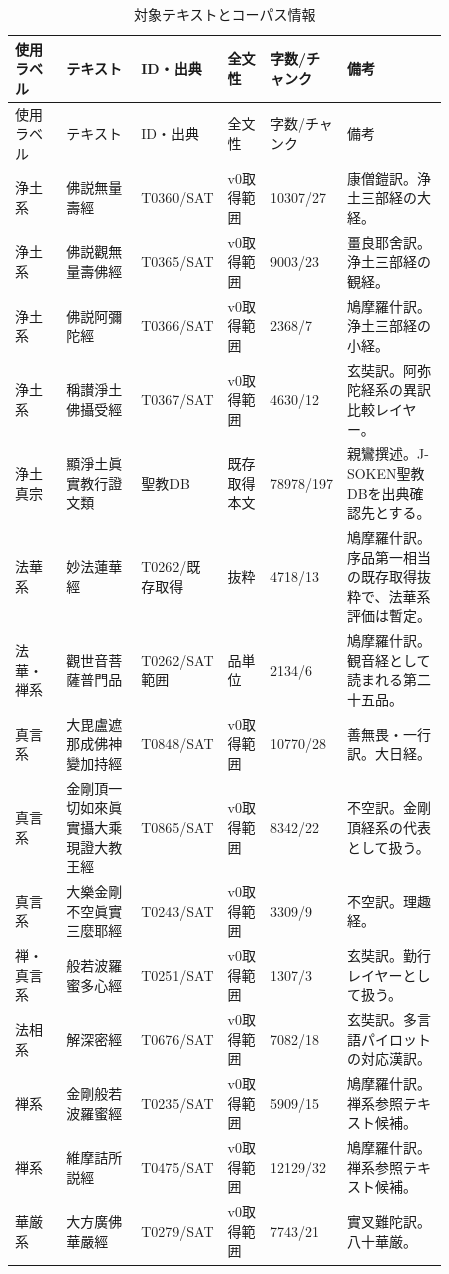 \documentclass[uplatex,dvipdfmx,11pt,a4paper]{jsarticle}
\begin{document}
{\small
\setlength{\tabcolsep}{3pt}
\begin{longtable}{@{}p{0.12\linewidth}p{0.18\linewidth}p{0.12\linewidth}p{0.10\linewidth}p{0.10\linewidth}p{0.24\linewidth}@{}}
\caption{対象テキストとコーパス情報}\\
\toprule
使用ラベル & テキスト & ID・出典 & 全文性 & 字数/チャンク & 備考 \\
\midrule
\endfirsthead
\toprule
使用ラベル & テキスト & ID・出典 & 全文性 & 字数/チャンク & 備考 \\
\midrule
\endhead
浄土系 & 佛説無量壽經 & T0360/SAT & v0取得範囲 & 10307/27 & 康僧鎧訳。浄土三部経の大経。 \\
浄土系 & 佛説觀無量壽佛經 & T0365/SAT & v0取得範囲 & 9003/23 & 畺良耶舍訳。浄土三部経の観経。 \\
浄土系 & 佛説阿彌陀經 & T0366/SAT & v0取得範囲 & 2368/7 & 鳩摩羅什訳。浄土三部経の小経。 \\
浄土系 & 稱讃淨土佛攝受經 & T0367/SAT & v0取得範囲 & 4630/12 & 玄奘訳。阿弥陀経系の異訳比較レイヤー。 \\
浄土真宗 & 顯淨土眞實教行證文類 & 聖教DB & 既存取得本文 & 78978/197 & 親鸞撰述。J-SOKEN聖教DBを出典確認先とする。 \\
法華系 & 妙法蓮華經 & T0262/既存取得 & 抜粋 & 4718/13 & 鳩摩羅什訳。序品第一相当の既存取得抜粋で、法華系評価は暫定。 \\
法華・禅系 & 觀世音菩薩普門品 & T0262/SAT範囲 & 品単位 & 2134/6 & 鳩摩羅什訳。観音経として読まれる第二十五品。 \\
真言系 & 大毘盧遮那成佛神變加持經 & T0848/SAT & v0取得範囲 & 10770/28 & 善無畏・一行訳。大日経。 \\
真言系 & 金剛頂一切如來眞實攝大乘現證大教王經 & T0865/SAT & v0取得範囲 & 8342/22 & 不空訳。金剛頂経系の代表として扱う。 \\
真言系 & 大樂金剛不空眞實三麼耶經 & T0243/SAT & v0取得範囲 & 3309/9 & 不空訳。理趣経。 \\
禅・真言系 & 般若波羅蜜多心經 & T0251/SAT & v0取得範囲 & 1307/3 & 玄奘訳。勤行レイヤーとして扱う。 \\
法相系 & 解深密經 & T0676/SAT & v0取得範囲 & 7082/18 & 玄奘訳。多言語パイロットの対応漢訳。 \\
禅系 & 金剛般若波羅蜜經 & T0235/SAT & v0取得範囲 & 5909/15 & 鳩摩羅什訳。禅系参照テキスト候補。 \\
禅系 & 維摩詰所説經 & T0475/SAT & v0取得範囲 & 12129/32 & 鳩摩羅什訳。禅系参照テキスト候補。 \\
華厳系 & 大方廣佛華嚴經 & T0279/SAT & v0取得範囲 & 7743/21 & 實叉難陀訳。八十華厳。 \\
\bottomrule
\end{longtable}
}
\end{document}
